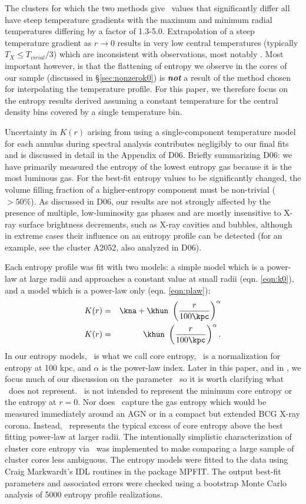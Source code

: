 \documentclass{emulateapj}
\begin{document}
The clusters for which the two methods give \kna\ values that
significantly differ all have steep temperature gradients with the
maximum and minimum radial temperatures differing by a factor of
1.3-5.0. Extrapolation of a steep temperature gradient as $r
\rightarrow 0$ results in very low central temperatures (typically
$T_X \leq T_{virial}/3$) which are inconsistent with observations,
most notably \citet{peterson03}. Most important however, is that the
flattening of entropy we observe in the cores of our sample (discussed
in \S\ref{sec:nonzerok0}) is {\bfseries\em{not}} a result of the
method chosen for interpolating the temperature profile. For this
paper, we therefore focus on the entropy results derived assuming a
constant temperature for the central density bins covered by a single
temperature bin.

Uncertainty in $K(r)$ arising from using a single-component
temperature model for each annulus during spectral analysis
contributes negligibly to our final fits and is discussed in detail in
the Appendix of D06. Briefly summarizing D06: we have primarily
measured the entropy of the lowest entropy gas because it is the most
luminous gas. For the best-fit entropy values to be significantly
changed, the volume filling fraction of a higher-entropy component
must be non-trivial ($> 50\%$). As discussed in D06, our results are
not strongly affected by the presence of multiple, low-luminosity gas
phases and are mostly insensitive to X-ray surface brightness
decrements, such as X-ray cavities and bubbles, although in extreme
cases their influence on an entropy profile can be detected (for an
example, see the cluster A2052, also analyzed in D06).

Each entropy profile was fit with two models: a simple model which is
a power-law at large radii and approaches a constant value at small
radii (eqn. \ref{eqn:k0}), and a model which is a power-law only
(eqn. \ref{eqn:plaw}):
\begin{eqnarray}
K(r) &=& \kna + \khun\ \left(\frac{r}{100 \kpc}\right)^{\alpha}\label{eqn:k0}\\
K(r) &=& \khun\ \left(\frac{r}{100 \kpc}\right)^{\alpha}\label{eqn:plaw}.
\end{eqnarray}
In our entropy models, \kna\ is what we call core entropy, \khun\ is a
normalization for entropy at 100 kpc, and $\alpha$ is the power-law
index. Later in this paper, and in \citet{haradent}, we focus much of
our discussion on the parameter \kna\ so it is worth clarifying what
\kna\ does not represent. \kna\ is not intended to represent the
minimum core entropy or the entropy at $r=0$. Nor does \kna\ capture
the gas entropy which would be measured immediately around an AGN or
in a compact but extended BCG X-ray corona. Instead, \kna\ represents
the typical excess of core entropy above the best fitting power-law at
larger radii. The intentionally simplistic characterization of cluster
core entropy via \kna\ was implemented to make comparing a large
sample of cluster cores less ambiguous. The entropy models were fitted
to the data using Craig Markwardt's IDL routines in the package
MPFIT. The output best-fit parameters and associated errors were
checked using a bootstrap Monte Carlo analysis of 5000 entropy
profile realizations.
\end{document}
